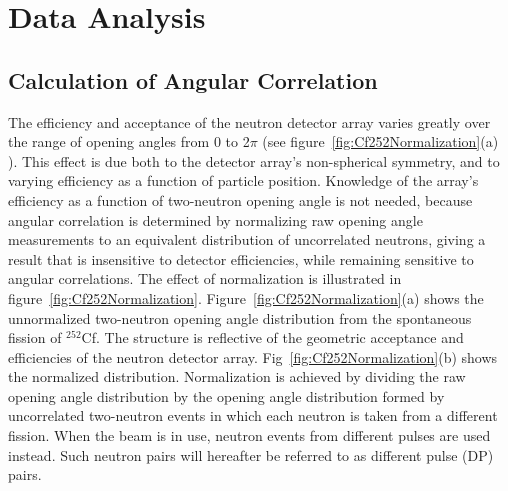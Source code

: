 \section{Data Analysis}
\label{Analysis}
\subsection{Calculation of Angular Correlation}
The efficiency and acceptance of the neutron detector array varies greatly over the range of opening angles from 0 to 2$\pi$ (see figure~\ref{fig:Cf252Normalization}(a) ). This effect is due both to the detector array's non-spherical symmetry, and to varying efficiency as a function of particle position.
Knowledge of the array's efficiency as a function of two-neutron opening angle is not needed, because angular correlation is determined by normalizing raw opening angle measurements to an equivalent distribution of uncorrelated neutrons, giving a result that is insensitive to detector efficiencies, while remaining sensitive to angular correlations.
The effect of normalization is illustrated in figure~\ref{fig:Cf252Normalization}. 
Figure~\ref{fig:Cf252Normalization}(a) shows the unnormalized two-neutron opening angle distribution from the spontaneous fission of $^{252}$Cf. The structure is reflective of the geometric acceptance and efficiencies of the neutron detector array. Fig~\ref{fig:Cf252Normalization}(b) shows the normalized distribution. Normalization is achieved by dividing the raw opening angle distribution by the opening angle  distribution formed by uncorrelated two-neutron events in which each neutron is taken from a different fission. When the beam is in use, neutron events from different pulses are used instead. Such neutron pairs will hereafter be referred to as different pulse (DP) pairs.

